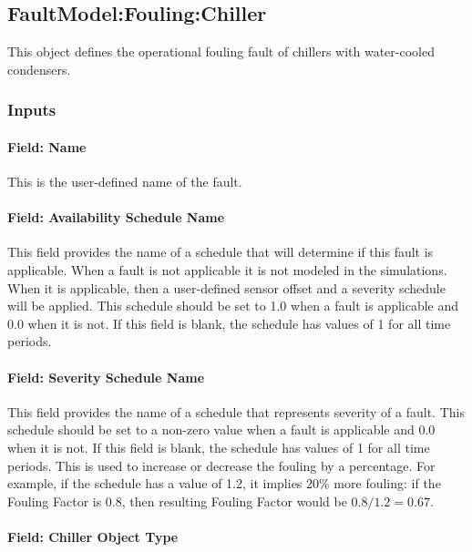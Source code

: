 \subsection{FaultModel:Fouling:Chiller}\label{faultmodelfoulingchiller}

This object defines the operational fouling fault of chillers with water-cooled condensers.

\subsubsection{Inputs}

\paragraph{Field: Name}

This is the user-defined name of the fault.

\paragraph{Field: Availability Schedule Name}

This field provides the name of a schedule that will determine if this fault is applicable. When a fault is not applicable it is not modeled in the simulations. When it is applicable, then a user-defined sensor offset and a severity schedule will be applied. This schedule should be set to 1.0 when a fault is applicable and 0.0 when it is not. If this field is blank, the schedule has values of 1 for all time periods.

\paragraph{Field: Severity Schedule Name}

This field provides the name of a schedule that represents severity of a fault. This schedule should be set to a non-zero value when a fault is applicable and 0.0 when it is not. If this field is blank, the schedule has values of 1 for all time periods.
This is used to increase or decrease the fouling by a percentage. For example, if the schedule has a value of 1.2, it implies 20\% more fouling: if the Fouling Factor is 0.8, then resulting Fouling Factor would be $0.8 / 1.2 = 0.67$.

\paragraph{Field: Chiller Object Type}\label{field-chiller-object-type}

